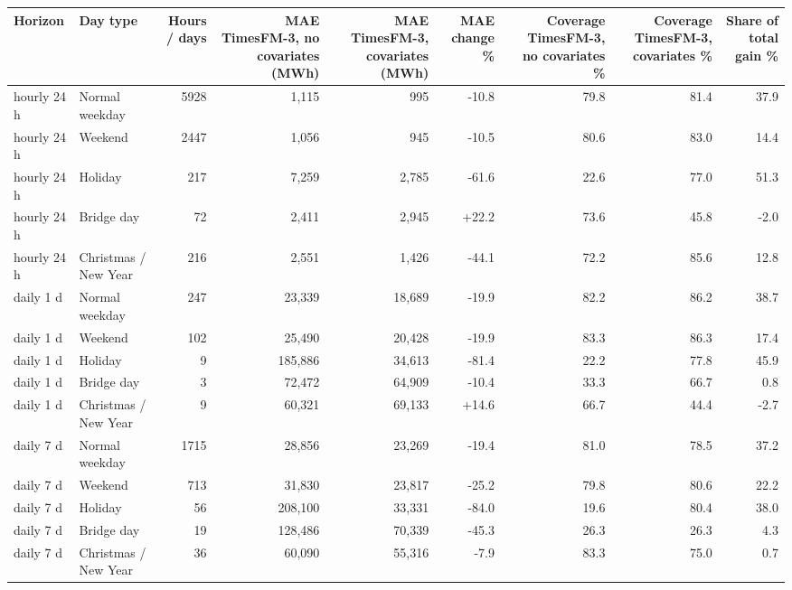 \begin{tabular}{llrrrrrrr}
\toprule
Horizon & Day type & Hours / days & MAE TimesFM-3, no covariates (MWh) & MAE TimesFM-3, covariates (MWh) & MAE change \% & Coverage TimesFM-3, no covariates \% & Coverage TimesFM-3, covariates \% & Share of total gain \% \\
\midrule
hourly 24 h & Normal weekday & 5928 & 1,115 & 995 & -10.8 & 79.8 & 81.4 & 37.9 \\
hourly 24 h & Weekend & 2447 & 1,056 & 945 & -10.5 & 80.6 & 83.0 & 14.4 \\
hourly 24 h & Holiday & 217 & 7,259 & 2,785 & -61.6 & 22.6 & 77.0 & 51.3 \\
hourly 24 h & Bridge day & 72 & 2,411 & 2,945 & +22.2 & 73.6 & 45.8 & -2.0 \\
hourly 24 h & Christmas / New Year & 216 & 2,551 & 1,426 & -44.1 & 72.2 & 85.6 & 12.8 \\
daily 1 d & Normal weekday & 247 & 23,339 & 18,689 & -19.9 & 82.2 & 86.2 & 38.7 \\
daily 1 d & Weekend & 102 & 25,490 & 20,428 & -19.9 & 83.3 & 86.3 & 17.4 \\
daily 1 d & Holiday & 9 & 185,886 & 34,613 & -81.4 & 22.2 & 77.8 & 45.9 \\
daily 1 d & Bridge day & 3 & 72,472 & 64,909 & -10.4 & 33.3 & 66.7 & 0.8 \\
daily 1 d & Christmas / New Year & 9 & 60,321 & 69,133 & +14.6 & 66.7 & 44.4 & -2.7 \\
daily 7 d & Normal weekday & 1715 & 28,856 & 23,269 & -19.4 & 81.0 & 78.5 & 37.2 \\
daily 7 d & Weekend & 713 & 31,830 & 23,817 & -25.2 & 79.8 & 80.6 & 22.2 \\
daily 7 d & Holiday & 56 & 208,100 & 33,331 & -84.0 & 19.6 & 80.4 & 38.0 \\
daily 7 d & Bridge day & 19 & 128,486 & 70,339 & -45.3 & 26.3 & 26.3 & 4.3 \\
daily 7 d & Christmas / New Year & 36 & 60,090 & 55,316 & -7.9 & 83.3 & 75.0 & 0.7 \\
\bottomrule
\end{tabular}
